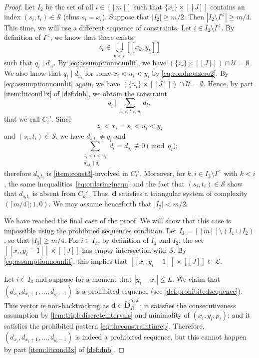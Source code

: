 \documentclass[11pt]{amsart}
\theoremstyle{definition}
\renewcommand{\leq}{\leqslant}
\renewcommand{\geq}{\geqslant}
\newcommand{\interval}[2]{[\![#1,#2]\!] }
\newcommand{\sinterval}[1]{[\![#1]\!] }
\newcommand{\abs}[1]{\left|#1\right|}
\renewcommand{\d}{\boldsymbol{d}}
\newcommand{\pcomp}[2]{d_{#1#2}}
\newcommand{\bmid}{\  \Big\vert}
\newcommand{\lit}{\mathcal{L}}
\newcommand{\unlit}{\mathcal{U}}
\newcommand{\s}{\mathcal{S}}
\newcommand{\fancyD}{\mathbf{D}}
\newcommand{\Dnb}{\widetilde{\fancyD}^{\s,\lit}_{\!\tupsize}}
\newcommand{\elln}{L}
\newcommand{\newR}{\sinterval{J}}
\newcommand{\mm}{m}
\newcommand{\tupsize}{R}
\newcommand{\thisx}{x}
\newcommand{\thisy}{y}
\begin{document}
\begin{proof}
Let $I_2$ be the set of all $i \in \sinterval{\mm}$ such that $\{\thisx_i\}\times \newR$ contains an index $(s_i, t_i)\in \s$ (thus $s_i = \thisx_i$). Suppose that $\abs{I_2} \geq \mm/2$. Then $\abs{I_2\setminus I^<} \geq \mm/4$. This time, we will use a different sequence of constraints.  Let $i \in I_2\setminus I^<$. By definition of $I^<$, we know that there exists
\begin{equation*}
	z_i \in \bigcup_{k<i} \interval{\thisx_{k}}{\thisy_{k}}
\end{equation*}
such that $q_i \mid d_{z_i}$. By \cref{eq:assumptionnounlit}, we have $(\{z_i\}\times \newR)\cap \unlit = \emptyset$. We also know that $q_i\mid d_{u_i}$ for some $\thisx_i<u_i<\thisy_i$ by \cref{eq:condnonzero2}. By \cref{eq:assumptionnounlit} again, we have $(\{u_i\}\times \newR)\cap \unlit = \emptyset$. Hence, by part \cref{item:litcond1x} of \cref{def:dnb}, we obtain the constraint
\begin{equation*}
	q_i \bmid\,  \sum_{z_i<l<u_i} d_l,
\end{equation*}
that we call $C_i'$. Since 
\begin{equation}
\label{eq:orderinginequ}
	z_i<\thisx_i=s_i<u_i<\thisy_i
\end{equation}
and $(s_i, t_i)\in \s$, we have $\pcomp{s_i}{t_i} \neq q_i$ and
\begin{equation*}
	\sum_{\substack{z_i < l < u_i \\ \pcomp{s_i}{t_i} \mid d_l}} d_l = d_{s_i} \not\equiv 0 \pmod{q_i};
\end{equation*}
therefore $\pcomp{s_i}{t_i}$ is \cref{item:const3}-involved in $C_i'$. Moreover, for $k,i\in I_2\setminus I^<$ with $k<i$, the same inequalities~\cref{eq:orderinginequ} and the fact that $(s_{i}, t_{i})\in \s$ show that $\pcomp{s_{i}}{t_{i}}$ is absent from $C_{k}'$. Thus, $\d$ satisfies a triangular system of complexity $(\lceil \mm/4 \rceil; 1, 0)$. We may assume henceforth that $\abs{I_2} < \mm/2$.

We have reached the final case of the proof. We will show that this case is impossible using the prohibited sequences condition. Let $I_3 = \sinterval{\mm} \setminus (I_1\cup I_2)$, so that $\abs{I_3} \geq \mm/4$. For $i \in I_3$, by definition of $I_1$ and $I_2$, the set $\interval{\thisx_i}{\thisy_i-1}\times \newR$ has empty intersection with $\s$. By \cref{eq:assumptionnounlit}, this implies that $\interval{\thisx_i}{\thisy_i-1}\times \newR\subset \lit$. 

Let $i \in I_3$ and suppose for a moment that $\abs{\thisy_i-\thisx_i} \leq \elln$. We claim that $(d_{\thisx_i}, d_{\thisx_i+1}, \ldots, d_{\thisy_i-1})$ is a prohibited sequence (see \cref{def:prohibitedsequence}). This vector is non-backtracking as $\d\in \Dnb$; it satisfies the consecutiveness assumption by \cref{lem:triplediscreteintervals} and minimality of $(\thisx_i, \thisy_i, p_i)$; and it satisfies the prohibited pattern \cref{eq:theconstraintinrep}. Therefore, $(d_{\thisx_i}, d_{\thisx_i+1}, \ldots, d_{\thisy_i-1})$ is indeed a prohibited sequence, but this cannot happen by part \cref{item:litcond3x} of \cref{def:dnb}. 


\end{proof}
\end{document}
